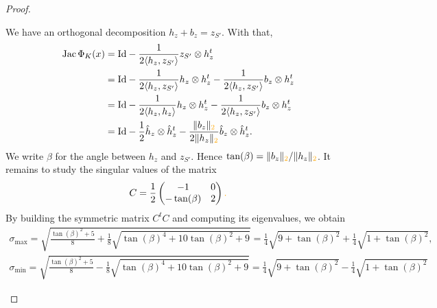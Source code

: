 \documentclass[10pt,letterpaper]{article}
\newcommand\cye[1]{%
  \protect\leavevmode
  \begingroup
    \color{red!35!yellow}%
    #1%
  \endgroup
}
\begin{document}
\begin{proof}
\begin{itemize}
        We have an orthogonal decomposition $h_{z} + b_{z} = z_{S'}$.
        With that,
        \begin{align*}
            \Jacobian \Phi_{K}(x)
            &=
            \Id 
            - 
            \frac{1}{ 2 \langle h_{z},z_{S'}\rangle }  
            z_{S'} \otimes h_{z}^{t}
            \\
            &=
            \Id 
            - 
            \frac{1}{ 2 \langle h_{z},z_{S'}\rangle } 
            h_{z} \otimes h_{z}^{t}
            - 
            \frac{1}{ 2 \langle h_{z},z_{S'}\rangle } 
            b_{z} \otimes h_{z}^{t}
            \\
            &=
            \Id 
            - 
            \frac{1}{ 2 \langle h_{z}, h_{z}\rangle } 
            h_{z} \otimes h_{z}^{t}
            - 
            \frac{1}{ 2 \langle h_{z},z_{S'}\rangle } 
            b_{z} \otimes h_{z}^{t}
            \\
            &=
            \Id 
            - 
            \frac{1}{ 2 } 
            \hat h_{z} \otimes \hat h_{z}^{t}
            - 
            \frac{ \|b_z\|_{\cye{2}} }{ 2 \| h_{z} \|_{\cye{2}} } 
            \hat b_{z} \otimes \hat h_{z}^{t}
            .
        \end{align*}
        We write $\beta$ for the angle between $h_{z}$ and $z_{S'}$.
        Hence $\tan(\beta) = \| b_z \|_{\cye{2}} / \| h_z \|_{\cye{2}}$. It remains to study the singular values of the matrix 
        \begin{align*}
            C 
            = 
            \frac 1 2 
            \begin{pmatrix}
                -1 & 0 
                \\
                -\tan(\beta) & 2 
            \end{pmatrix}\cye{.}
        \end{align*}
        By building the symmetric matrix $C^{t} C$ and computing its eigenvalues, we obtain 
        \begin{align*}
            \sigma_{\max} 
            = 
            \sqrt{ \frac{ \tan(\beta)^{2} + 5 }{8} + \frac 1 8 \sqrt{ \tan(\beta)^{4} + 10 \tan(\beta)^{2} + 9 } }
            =
            \frac 1 4 \sqrt{ 9 + \tan(\beta)^2 } + \frac 1 4 \sqrt{ 1 + \tan(\beta)^2 }
            ,
            \\
            \sigma_{\min} 
            = 
            \sqrt{ \frac{ \tan(\beta)^{2} + 5 }{8} - \frac 1 8 \sqrt{ \tan(\beta)^{4} + 10 \tan(\beta)^{2} + 9 } }
            =
            \frac 1 4 \sqrt{ 9 + \tan(\beta)^2 } - \frac 1 4 \sqrt{ 1 + \tan(\beta)^2 }

\end{align*}
\end{itemize}
\end{proof}
\end{document}
